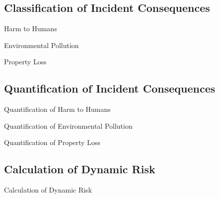 \subsection{Classification of Incident Consequences}
\begin{frame}{Harm to Humans}
\end{frame}

\begin{frame}{Environmental Pollution}
\end{frame}

\begin{frame}{Property Loss}
\end{frame}

\subsection{Quantification of Incident Consequences}
\begin{frame}{Quantification of Harm to Humans}
\end{frame}

\begin{frame}{Quantification of Environmental Pollution}
\end{frame}

\begin{frame}{Quantification of Property Loss}
\end{frame}

\subsection{Calculation of Dynamic Risk}
\begin{frame}{Calculation of Dynamic Risk}
\end{frame} 